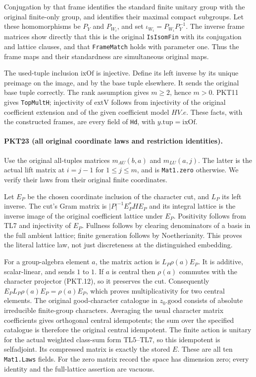 Conjugation by that frame identifies the standard finite unitary group
with the original finite-only group, and identifies their maximal compact
subgroups.  Let these homomorphisms be $P_Y$ and $P_{W_i}$, and set
$\iota_{W_i}=P_{W_i}P_Y^{-1}$.  The inverse frame matrices show directly
that this is the original \texttt{IsIsomFin} with its conjugation and
lattice clauses, and that \texttt{FrameMatch} holds with parameter one.
Thus the frame maps and their standardness are simultaneous original maps.

The used-tuple inclusion $\mathrm{ixOf}$ is injective.  Define its left
inverse by its unique preimage on the image, and by the base tuple elsewhere.
It sends the original base tuple correctly.  The rank assumption gives
$m\ge2$, hence $m>0$.  PKT11 gives \texttt{TopMultH}; injectivity of
$\mathrm{extV}$ follows from injectivity of the original coefficient
extension and of the given coefficient model $HV.e$.  These facts, with
the constructed frames, are every field of \texttt{Hd}, with
$y.\mathrm{tup}=\mathrm{ixOf}$.

\paragraph{PKT23 (all original coordinate laws and restriction identities).}\label{claim:PKT23}
Use the original all-tuples matrices $m_{AU}(b,a)$ and $m_{LU}(a,j)$.
The latter is the actual lift matrix at $i=j-1$ for $1\le j\le m$,
and is \texttt{Mat1.zero} otherwise.  We verify their laws from their
original finite coordinates.

Let $E_P$ be the chosen coordinate inclusion of the character cut, and
$L_P$ its left inverse.  The cut's Gram matrix is
$|P|^{-1}E_P^*HE_P$ and its integral lattice is the inverse image of the
original coefficient lattice under $E_P$.  Positivity follows from TL7
and injectivity of $E_P$.  Fullness follows by clearing denominators of
a basis in the full ambient lattice; finite generation follows by
Noetherianity.  This proves the literal lattice law, not just discreteness
at the distinguished embedding.

For a group-algebra element $a$, the matrix action is
$L_P\rho(a)E_P$.  It is additive, scalar-linear, and sends $1$ to $1$.
If $a$ is central then $\rho(a)$ commutes with the character projector
(PKT.12), so it preserves the cut.  Consequently
$E_PL_P\rho(a)E_P=\rho(a)E_P$, which proves multiplicativity for two
central elements.  The original good-character catalogue in $z_0.\mathrm{good}$
consists of absolute irreducible finite-group characters.  Averaging the
usual character matrix coefficients gives orthogonal central idempotents;
the sum over the specified catalogue is therefore the original central
idempotent.  The finite action is unitary for the actual weighted class-sum
form TL5--TL7, so this idempotent is selfadjoint.  Its compressed matrix is
exactly the stored $E$.  These are all ten \texttt{Mat1.Laws} fields.
For the zero matrix record the space has dimension zero; every identity
and the full-lattice assertion are vacuous.


